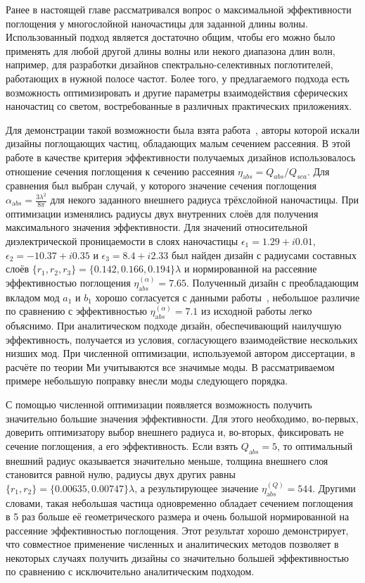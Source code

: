 Ранее в настоящей главе рассматривался вопрос о максимальной
эффективности поглощения у многослойной наночастицы для заданной длины
волны.  Использованный подход является достаточно общим, чтобы
его можно было применять для любой другой длины волны или некого
диапазона длин волн, например, для разработки дизайнов
спектрально-селективных поглотителей, работающих в нужной полосе
частот.  Более того, у предлагаемого подхода есть возможность
оптимизировать и другие параметры взаимодействия сферических
наночастиц со светом, востребованные в различных практических
приложениях.

Для демонстрации такой возможности была взята работа~\cite{Alu-2014},
авторы которой искали дизайны поглощающих частиц, обладающих малым
сечением рассеяния. В этой работе в качестве критерия эффективности
получаемых дизайнов использовалось отношение сечения поглощения к
сечению рассеяния $\eta_{\mathrm abs} = Q_{abs}/Q_{sca}$.  Для
сравнения был выбран случай, у которого значение сечения поглощения
$\alpha_{\mathrm abs}=\frac{3\lambda^2}{8\pi}$ для некого заданного
внешнего радиуса трёхслойной наночастицы.  При оптимизации изменялись
радиусы двух внутренних слоёв для получения максимального значения
эффективности.  Для значений относительной диэлектрической
проницаемости в слоях наночастицы $\epsilon_1 = 1.29+i0.01$,
$\epsilon_2 = -10.37+ i0.35$ и $\epsilon_3=8.4+i2.33$ был найден
дизайн с радиусами составных слоёв
$\{r_1, r_2, r_3\}=\{0.142,0.166,0.194\}\lambda$ и нормированной на
рассеяние эффективностью поглощения
$\eta_{\mathrm abs}^{(\alpha)} =7.65$.  Полученный дизайн с
преобладающим вкладом мод $a_1$ и $b_1$ хорошо согласуется с данными
работы~\cite{Alu-2014}, небольшое различие по сравнению с
эффективностью $\eta_{\mathrm abs}^{(\alpha)} =7.1$ из исходной работы
легко объяснимо.  При аналитическом подходе дизайн, обеспечивающий
наилучшую эффективность, получается из условия, согласующего
взаимодействие нескольких низших мод.  При численной оптимизации,
используемой автором диссертации, в расчёте по теории Ми учитываются
все значимые моды.  В рассматриваемом примере небольшую поправку
внесли моды следующего порядка.

С помощью численной оптимизации появляется возможность получить
значительно большие значения эффективности.  Для этого
необходимо, во-первых, доверить оптимизатору выбор внешнего радиуса и,
во-вторых, фиксировать не сечение поглощения, а его эффективность.
Если взять $Q_{\mathrm abs} = 5$, то оптимальный внешний радиус
оказывается значительно меньше, толщина внешнего слоя становится
равной нулю, радиусы двух других равны
$\{r_1, r_2\}=\{0.00635,0.00747\}\lambda$, а результирующее значение
$\eta_{\mathrm abs}^{(Q)} =544$.  Другими словами, такая небольшая
частица одновременно обладает сечением поглощения в 5 раз больше её
геометрического размера и очень большой нормированной на рассеяние
эффективностью поглощения. Этот результат хорошо демонстрирует, что
совместное применение численных и аналитических методов позволяет в
некоторых случаях получить дизайны со значительно большей
эффективностью по сравнению с исключительно аналитическим подходом.


